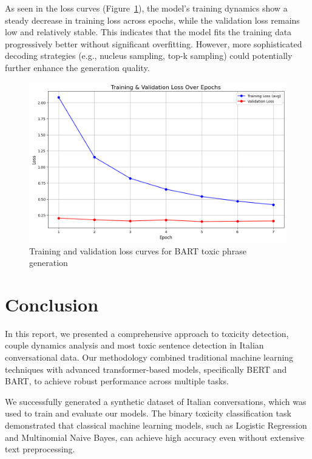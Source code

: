 \documentclass[conference]{IEEEtran}
\begin{document}
As seen in the loss curves (Figure~\ref{fig:bart_loss_toxic}), the model's training dynamics show a steady decrease in training loss across epochs, while the validation loss remains low and relatively stable. This indicates that the model fits the training data progressively better without significant overfitting. However, more sophisticated decoding strategies (e.g., nucleus sampling, top-k sampling) could potentially further enhance the generation quality.

\begin{figure}[H]
  \centering
  \includegraphics[width=\columnwidth]{figures/bart_toxic_loss_curves.png}
  \caption{Training and validation loss curves for BART toxic phrase generation}
  \label{fig:bart_loss_toxic}
\end{figure}

\section{Conclusion}

In this report, we presented a comprehensive approach to toxicity detection, couple dynamics analysis and most toxic sentence detection in Italian conversational data. Our methodology combined traditional machine learning techniques with advanced transformer-based models, specifically BERT and BART, to achieve robust performance across multiple tasks.

We successfully generated a synthetic dataset of Italian conversations, which was used to train and evaluate our models. The binary toxicity classification task demonstrated that classical machine learning models, such as Logistic Regression and Multinomial Naive Bayes, can achieve high accuracy even without extensive text preprocessing.
\end{document}
